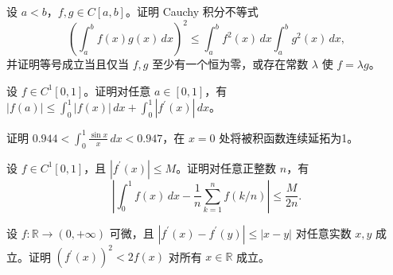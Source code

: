 \noindent\begin{minipage}{\textwidth}
设 $a<b$，$f,g\in C[a,b]$。证明 Cauchy 积分不等式\[\left(\int_a^b f(x)g(x)\,dx\right)^2\le\int_a^b f^2(x)\,dx\int_a^b g^2(x)\,dx,\]并证明等号成立当且仅当 $f,g$ 至少有一个恒为零，或存在常数 $\lambda$ 使 $f=\lambda g$。
\end{minipage}\par\vfill
\noindent\begin{minipage}{\textwidth}
设 $f\in C^1[0,1]$。证明对任意 $a\in[0,1]$，有 $\displaystyle|f(a)|\le\int_0^1|f(x)|\,dx+\int_0^1|f^{\prime}(x)|\,dx$。
\end{minipage}\par\vfill
\newpage
\noindent\begin{minipage}{\textwidth}
证明 $\displaystyle0.944<\int_0^1\frac{\sin x}{x}\,dx<0.947$，在 $x=0$ 处将被积函数连续延拓为1。
\end{minipage}\par\vfill
\noindent\begin{minipage}{\textwidth}
设 $f\in C^1[0,1]$，且 $|f^{\prime}(x)|\le M$。证明对任意正整数 $n$，有\[\left|\int_0^1 f(x)\,dx-\frac1n\sum_{k=1}^n f(k/n)\right|\le\frac M{2n}.\]
\end{minipage}\par\vfill
\noindent\begin{minipage}{\textwidth}
设 $f:\mathbb R\to(0,+\infty)$ 可微，且 $|f^{\prime}(x)-f^{\prime}(y)|\le|x-y|$ 对任意实数 $x,y$ 成立。证明 $(f^{\prime}(x))^2<2f(x)$ 对所有 $x\in\mathbb R$ 成立。
\end{minipage}\par\vfill
